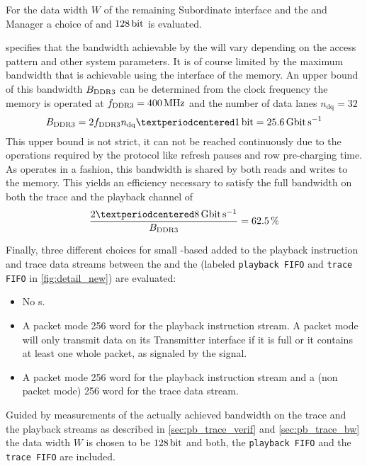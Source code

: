 For the data width $W$ of the remaining \XilinxMIG{} \AXI{} Subordinate interface and the \SToMM{} and \MMToS{} \AXI{} Manager a choice of \PhyWordSize{} and $\SI{128}{\bit}$ is evaluated.

\Xilinx{} specifies that the bandwidth achievable by the \XilinxMIG{} will vary depending on the access pattern and other system parameters. It is of course limited by the maximum bandwidth that is achievable using the \DDR{} interface of the memory. An upper bound of this bandwidth $B_{\text{DDR3{}}}$ can be determined from the clock frequency the memory is operated at $f_{\text{DDR3{}}} = \SI{400}{\mega\hertz}$ and the number of data lanes $n_{\text{dq}} = \num{32}$
\[B_{\text{\DDR{}}} = 2 f_{\text{\DDR{}}} n_{\text{dq}} · \SI{1}{\bit} = \SI{25.6}{\giga\bit\per\second}\]
This upper bound is not strict, it can not be reached continuously due to the operations required by the \DDR{} protocol like refresh pauses and row pre-charging time\autocite{ref:ddr3_standard}. As \DDR{} operates in a \halfduplex{} fashion, this bandwidth is shared by both reads and writes to the memory. This yields an efficiency necessary to satisfy the full bandwidth on both the trace and the playback channel of
\[\frac{2 · \pbExecBandwidth{}}{B_{\text{\DDR{}}}} = \SI{62.5}{\percent}\]

Finally, three different choices for small \BRAM{}-based \FIFO{} added to the playback instruction and trace data streams  between the \pbexec{} and the \AXIDMA{} (labeled \texttt{playback FIFO} and \texttt{trace FIFO} in \autoref{fig:detail_new}) are evaluated:
\begin{itemize}
\item No \FIFO{}s.
\item A packet mode \num{256} word \FIFO{} for the playback instruction stream. A packet mode \FIFO{} will only transmit data on its Transmitter interface if it is full or it contains at least one whole packet, as signaled by the \TLAST{} signal.
\item A packet mode \num{256} word \FIFO{} for the playback instruction stream and a (non packet mode) \num{256} word \FIFO{} for the trace data stream.
\end{itemize}

Guided by measurements of the actually achieved bandwidth on the trace and the playback streams as described in \autoref{sec:pb_trace_verif} and \autoref{sec:pb_trace_bw} the data width $W$ is chosen to be $\SI{128}{\bit}$ and both, the \texttt{playback FIFO} and the \texttt{trace FIFO} are included.


